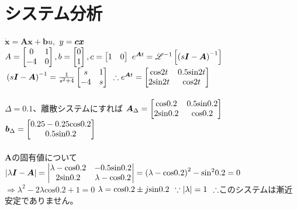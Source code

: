 \documentclass[12pt,a4paper]{article}
\begin{document}
\section{システム分析}
$\bm{\dot{x}}=\bm{Ax}+\bm{b}u,$
$\\y=\bm{cx}$
\\
$\\A=
\begin{bmatrix}
0 & 1\\
-4 & 0
\end{bmatrix},b=
\begin{bmatrix}
0\\
1
\end{bmatrix},c=
\begin{bmatrix}
1 & 0
\end{bmatrix}$
$\\e^{\bm{A}t}=\mathscr{L}^{-1}\left[\left(s\bm{I}-\bm{A}\right)^{-1}\right]$
$\\\left(s\bm{I}-\bm{A}\right)^{-1}=\frac{1}{s^2+4}
\begin{bmatrix}
s & 1\\
-4 & s
\end{bmatrix}$
$\\\therefore e^{\bm{A}t}=
\begin{bmatrix}
\mathrm{cos}2t & 0.5\mathrm{sin}2t\\
2\mathrm{sin}2t & \mathrm{cos}2t
\end{bmatrix}$
\\
\\
$\Delta=0.1$、離散システムにすれば
$\\\bm{A}_\Delta=
\begin{bmatrix}
\mathrm{cos}0.2 & 0.5\mathrm{sin}0.2\\
2\mathrm{sin}0.2 & \mathrm{cos}0.2
\end{bmatrix}$
$\\\bm{b}_\Delta=
\begin{bmatrix}
0.25-0.25\mathrm{cos}0.2\\
0.5\mathrm{sin}0.2
\end{bmatrix}$
\\
\\
$\bm{A}$の固有値について
$\\|\lambda\bm{I}-\bm{A}|=
\begin{vmatrix}
\lambda-\mathrm{cos}0.2 & -0.5\mathrm{sin}0.2\\
2\mathrm{sin}0.2 & \lambda-\mathrm{cos}0.2
\end{vmatrix}=\left(\lambda-\mathrm{cos}0.2\right)^2-\mathrm{sin}^20.2=0$
\\
$\Rightarrow \lambda^2-2\lambda\mathrm{cos}0.2+1=0$
$\\\lambda=\mathrm{cos}0.2\pm j\mathrm{sin}0.2$
$\\\because |\lambda|=1$
$\\\therefore$このシステムは漸近安定でありません。
\end{document}

